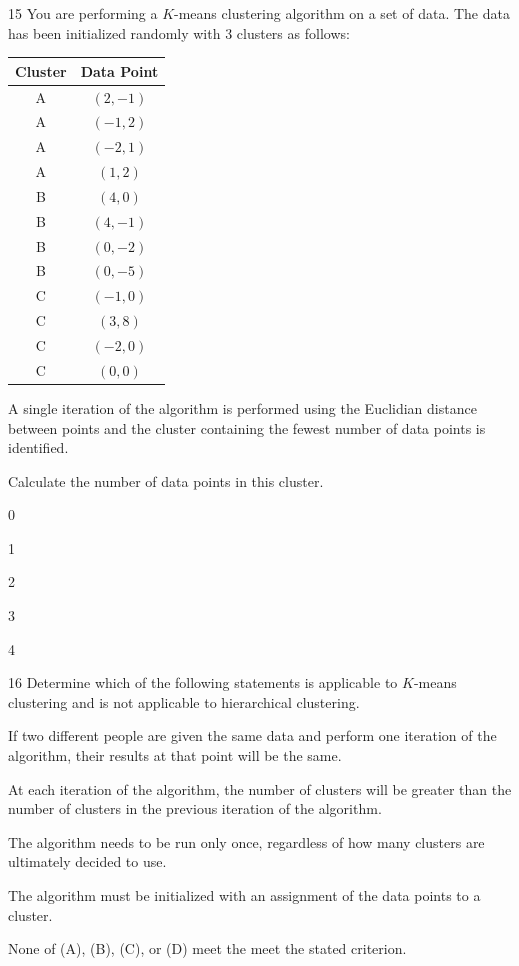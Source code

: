\begin{question}{15}
You are performing a $K$-means clustering algorithm on a set of data. The data has been initialized randomly with 3 clusters as follows:
\begin{center}
\begin{tabular}{|c|c|}
\hline
Cluster & Data Point \\ \hline
A & $(2, -1)$ \\ \hline
A & $(-1, 2)$ \\ \hline
A & $(-2, 1)$ \\ \hline
A & $(1, 2)$ \\ \hline
B & $(4, 0)$ \\ \hline
B & $(4, -1)$ \\ \hline
B & $(0, -2)$ \\ \hline
B & $(0, -5)$ \\ \hline
C & $(-1, 0)$ \\ \hline
C & $(3, 8)$ \\ \hline
C & $(-2, 0)$ \\ \hline
C & $(0, 0)$ \\ \hline
\end{tabular}
\end{center}

A single iteration of the algorithm is performed using the Euclidian distance between points and the cluster containing the fewest number of data points is identified.

Calculate the number of data points in this cluster.

\begin{choices}
\item 0
\item 1
\item 2
\item 3
\item 4
\end{choices}
\end{question}

\begin{question}{16}
Determine which of the following statements is applicable to $K$-means clustering and is not applicable to hierarchical clustering.

\begin{choices}
\item If two different people are given the same data and perform one iteration of the algorithm, their results at that point will be the same.
\item At each iteration of the algorithm, the number of clusters will be greater than the number of clusters in the previous iteration of the algorithm.
\item The algorithm needs to be run only once, regardless of how many clusters are ultimately decided to use.
\item The algorithm must be initialized with an assignment of the data points to a cluster.
\item None of (A), (B), (C), or (D) meet the meet the stated criterion.
\end{choices}
\end{question}

